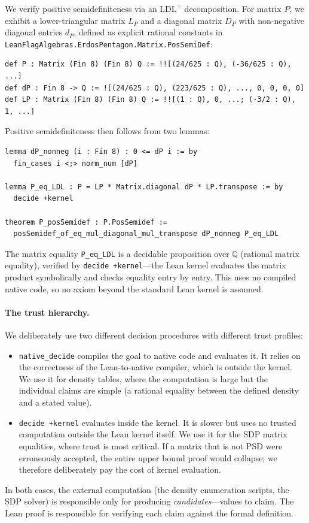 \documentclass{article}
\newcommand{\Q}{\mathbb{Q}}
\newcommand{\lean}[1]{\texttt{#1}}
\begin{document}
We verify positive semidefiniteness via an LDL$^\top$ decomposition.  For
matrix $P$, we exhibit a lower-triangular matrix $L_P$ and a diagonal matrix
$D_P$ with non-negative diagonal entries $d_P$, defined as explicit rational
constants in \lean{LeanFlagAlgebras.ErdosPentagon.Matrix.PosSemiDef}:
\begin{lstlisting}
def P : Matrix (Fin 8) (Fin 8) Q := !![(24/625 : Q), (-36/625 : Q), ...]
def dP : Fin 8 -> Q := ![(24/625 : Q), (223/625 : Q), ..., 0, 0, 0, 0]
def LP : Matrix (Fin 8) (Fin 8) Q := !![(1 : Q), 0, ...; (-3/2 : Q), 1, ...]
\end{lstlisting}
Positive semidefiniteness then follows from two lemmas:
\begin{lstlisting}
lemma dP_nonneg (i : Fin 8) : 0 <= dP i := by
  fin_cases i <;> norm_num [dP]

lemma P_eq_LDL : P = LP * Matrix.diagonal dP * LP.transpose := by
  decide +kernel

theorem P_posSemidef : P.PosSemidef :=
  posSemidef_of_eq_mul_diagonal_mul_transpose dP_nonneg P_eq_LDL
\end{lstlisting}
The matrix equality \lean{P\_eq\_LDL} is a decidable proposition over $\Q$
(rational matrix equality), verified by \lean{decide +kernel}---the Lean
kernel evaluates the matrix product symbolically and checks equality entry by
entry.  This uses no compiled native code, so no axiom beyond the standard
Lean kernel is assumed.

\paragraph{The trust hierarchy.}
We deliberately use two different decision procedures with different trust
profiles:
\begin{itemize}
  \item \lean{native\_decide} compiles the goal to native code and evaluates
    it.  It relies on the correctness of the Lean-to-native compiler, which is
    outside the kernel.  We use it for density tables, where the computation is
    large but the individual claims are simple (a rational equality between the
    defined density and a stated value).

  \item \lean{decide +kernel} evaluates inside the kernel.  It is slower but
    uses no trusted computation outside the Lean kernel itself.  We use it for
    the SDP matrix equalities, where trust is most critical.  If a matrix
    that is not PSD were erroneously accepted, the entire upper bound proof
    would collapse; we therefore deliberately pay the cost of kernel evaluation.
\end{itemize}
In both cases, the external computation (the density enumeration scripts, the
SDP solver) is responsible only for producing \emph{candidates}---values to
claim.  The Lean proof is responsible for verifying each claim against the
formal definition.
\end{document}
